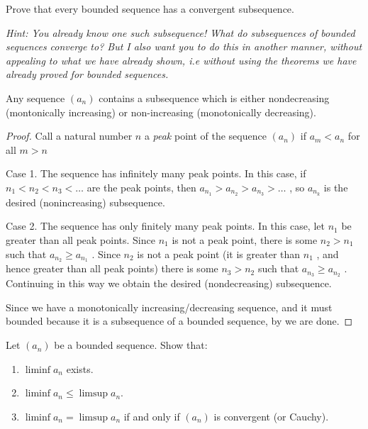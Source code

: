 \begin{exc}
    \begin{exercise}[subtitle = {Balzano Weirstrass Theorem}]

    Prove that every bounded sequence has a convergent subsequence.

    \emph{Hint: You already know one such subsequence! What do subsequences of bounded sequences converge to?
        But I also want you to do this in another manner, without appealing to what we have
        already shown, i.e without using the theorems we have already proved for bounded
        sequences.}
    \end{exercise}
    \begin{solution}
    \begin{claim}
    Any sequence $(a_n)$ contains a subsequence which is either nondecreasing (montonically
    increasing) or non-increasing (monotonically decreasing).
    \end{claim}
    \begin{proof}
    Call a natural number $n$ a \emph{peak} point of the sequence $(a_n)$ if $a_m < a_n$ for all
    $m > n$

    Case 1. The sequence has infinitely many peak points. In this case, if $n_1 < n_2 <
    n_3 < \ldots$ are the peak points, then $a_n_1 > a_n_2 > a_n_3 > \ldots$ , so $a_n_k$ is the desired
    (nonincreasing) subsequence.

    Case 2. The sequence has only finitely many peak points. In this case, let $n_1$ be greater
    than all peak points. Since $n_1$ is not a peak point, there is some $n_2 > n_1$ such that
    $a_n_2 \geq a_n_1$ . Since $n_2$ is not a peak point (it is greater than $n_1$ , and hence greater
    than all peak points) there is some $n_3 > n_2$ such that $a_n_3 \geq a_n_2$ . Continuing in this
    way we obtain the desired (nondecreasing) subsequence.

    Since we have a monotonically increasing/decreasing sequence, and it must bounded
    because it is a subsequence of a bounded sequence, by 
    we are done.
    \end{proof}
    \end{solution}
    \begin{exercise}
    Let $(a_n)$ be a bounded sequence. Show that:
    \begin{enumerate}
    \item $\liminf a_n$ exists.
    \item $\liminf a_n \leq \limsup a_n$.
    \item $\liminf a_n = \limsup a_n$ if and only if $(a_n)$ is convergent (or Cauchy).
    \end{enumerate}
    \end{exercise}
\end{exc}
